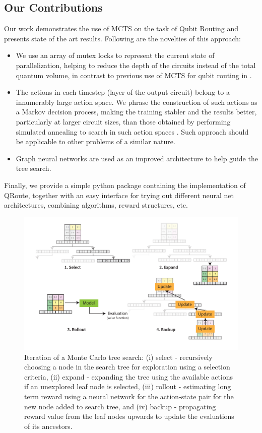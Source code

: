 \subsection{\label{sec:intro-contribution}Our Contributions}

Our work demonstrates the use of MCTS on the task of Qubit Routing and presents state of the art results. Following are the novelties of this approach:

\begin{itemize}
    \item We use an array of mutex locks to represent the current state of parallelization, helping to reduce the depth of the circuits instead of the total quantum volume, in contrast to previous use of MCTS for qubit routing in \cite{qroute_mcts}.
    \item The actions in each timestep (layer of the output circuit) belong to a innumerably large action space. We phrase the construction of such actions as a Markov decision process, making the training stabler and the results better, particularly at larger circuit sizes, than those obtained by performing simulated annealing to search in such action spaces \cite{qroute_dqn1, qroute_dqn2}. Such approach should be applicable to other problems of a similar nature.
    \item Graph neural networks are used as an improved architecture to help guide the tree search.
\end{itemize}

Finally, we provide a simple python package containing the implementation of QRoute, together with  an easy interface for trying out different neural net architectures, combining algorithms, reward structures, etc.

\begin{figure}[ht]
    \centering
    \includegraphics[width=\linewidth]{figures/qroute/Search.pdf}
    \caption{\label{fig:mcts-explainer}
        Iteration of a Monte Carlo tree search: (i) select - recursively choosing a node in the search tree for exploration using a selection criteria, (ii) expand - expanding the tree using the available actions if an unexplored leaf node is selected, (iii) rollout - estimating long term reward using a neural network for the action-state pair for the new node added to search tree, and (iv) backup - propagating reward value from the leaf nodes upwards to update the evaluations of its ancestors.}
\end{figure}


